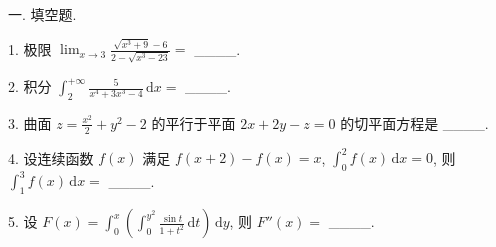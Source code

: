 \documentclass{examcollection}
\begin{document}
{\begin{minipage}{\textwidth}
\smallskip
一. 填空题.\par
1. 极限  $\lim_{x\to3}\frac{\sqrt{x^{3}+9}-6}{2-\sqrt{x^{3}-23}}=$  \_\_\_\_.\par
2. 积分 $\int_{2}^{+\infty} \frac{5}{x^4 + 3x^3 - 4} \, \mathrm{d}x =$ \_\_\_\_.\par
3. 曲面 $z = \frac{x^2}{2} + y^2 - 2$ 的平行于平面 $2x + 2y - z = 0$ 的切平面方程是 \_\_\_\_.\par
4. 设连续函数 $f(x)$ 满足 $f(x + 2) - f(x) = x$, $\int_0^2 f(x) \, \mathrm{d}x = 0$, 则 $\int_1^3 f(x) \, \mathrm{d}x =$ \_\_\_\_.\par
5. 设 $F(x) = \int_{0}^{x} \left( \int_{0}^{y^2} \frac{\sin t}{1 + t^2} \, \mathrm{d}t \right) \, \mathrm{d}y$, 则 $F''(x) =$ \_\_\_\_.\par
\end{minipage}}
\ifdim\dimexpr\ht\proofbox+\dp\proofbox\relax>\textheight
\noindent\resizebox{!}{\textheight}{\usebox{\proofbox}}\else\noindent\usebox{\proofbox}\fi\clearpage
\end{document}
